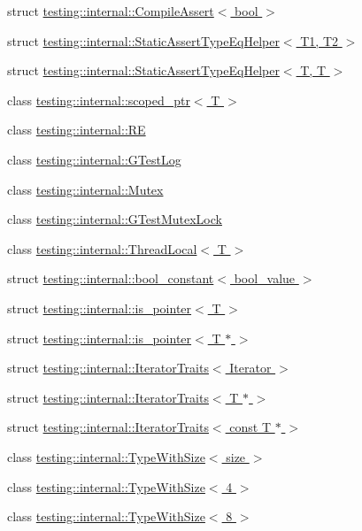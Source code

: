 \begin{DoxyCompactItemize}
\item 
struct \hyperlink{structtesting_1_1internal_1_1CompileAssert}{testing\+::internal\+::\+Compile\+Assert$<$ bool $>$}
\item 
struct \hyperlink{structtesting_1_1internal_1_1StaticAssertTypeEqHelper}{testing\+::internal\+::\+Static\+Assert\+Type\+Eq\+Helper$<$ T1, T2 $>$}
\item 
struct \hyperlink{structtesting_1_1internal_1_1StaticAssertTypeEqHelper_3_01T_00_01T_01_4}{testing\+::internal\+::\+Static\+Assert\+Type\+Eq\+Helper$<$ T, T $>$}
\item 
class \hyperlink{classtesting_1_1internal_1_1scoped__ptr}{testing\+::internal\+::scoped\+\_\+ptr$<$ T $>$}
\item 
class \hyperlink{classtesting_1_1internal_1_1RE}{testing\+::internal\+::\+RE}
\item 
class \hyperlink{classtesting_1_1internal_1_1GTestLog}{testing\+::internal\+::\+G\+Test\+Log}
\item 
class \hyperlink{classtesting_1_1internal_1_1Mutex}{testing\+::internal\+::\+Mutex}
\item 
class \hyperlink{classtesting_1_1internal_1_1GTestMutexLock}{testing\+::internal\+::\+G\+Test\+Mutex\+Lock}
\item 
class \hyperlink{classtesting_1_1internal_1_1ThreadLocal}{testing\+::internal\+::\+Thread\+Local$<$ T $>$}
\item 
struct \hyperlink{structtesting_1_1internal_1_1bool__constant}{testing\+::internal\+::bool\+\_\+constant$<$ bool\+\_\+value $>$}
\item 
struct \hyperlink{structtesting_1_1internal_1_1is__pointer}{testing\+::internal\+::is\+\_\+pointer$<$ T $>$}
\item 
struct \hyperlink{structtesting_1_1internal_1_1is__pointer_3_01T_01_5_01_4}{testing\+::internal\+::is\+\_\+pointer$<$ T $\ast$ $>$}
\item 
struct \hyperlink{structtesting_1_1internal_1_1IteratorTraits}{testing\+::internal\+::\+Iterator\+Traits$<$ Iterator $>$}
\item 
struct \hyperlink{structtesting_1_1internal_1_1IteratorTraits_3_01T_01_5_01_4}{testing\+::internal\+::\+Iterator\+Traits$<$ T $\ast$ $>$}
\item 
struct \hyperlink{structtesting_1_1internal_1_1IteratorTraits_3_01const_01T_01_5_01_4}{testing\+::internal\+::\+Iterator\+Traits$<$ const T $\ast$ $>$}
\item 
class \hyperlink{classtesting_1_1internal_1_1TypeWithSize}{testing\+::internal\+::\+Type\+With\+Size$<$ size $>$}
\item 
class \hyperlink{classtesting_1_1internal_1_1TypeWithSize_3_014_01_4}{testing\+::internal\+::\+Type\+With\+Size$<$ 4 $>$}
\item 
class \hyperlink{classtesting_1_1internal_1_1TypeWithSize_3_018_01_4}{testing\+::internal\+::\+Type\+With\+Size$<$ 8 $>$}
\end{DoxyCompactItemize}
